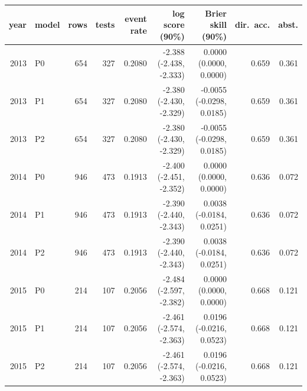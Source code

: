 \begin{tabular}{rlrrrrrrr}
\toprule
year & model & rows & tests & event rate & log score (90\%) & Brier skill (90\%) & dir.\ acc. & abst. \\
\midrule
2013 & P0 & 654 & 327 & 0.2080 & -2.388 (-2.438, -2.333) & 0.0000 (0.0000, 0.0000) & 0.659 & 0.361 \\
2013 & P1 & 654 & 327 & 0.2080 & -2.380 (-2.430, -2.329) & -0.0055 (-0.0298, 0.0185) & 0.659 & 0.361 \\
2013 & P2 & 654 & 327 & 0.2080 & -2.380 (-2.430, -2.329) & -0.0055 (-0.0298, 0.0185) & 0.659 & 0.361 \\
2014 & P0 & 946 & 473 & 0.1913 & -2.400 (-2.451, -2.352) & 0.0000 (0.0000, 0.0000) & 0.636 & 0.072 \\
2014 & P1 & 946 & 473 & 0.1913 & -2.390 (-2.440, -2.343) & 0.0038 (-0.0184, 0.0251) & 0.636 & 0.072 \\
2014 & P2 & 946 & 473 & 0.1913 & -2.390 (-2.440, -2.343) & 0.0038 (-0.0184, 0.0251) & 0.636 & 0.072 \\
2015 & P0 & 214 & 107 & 0.2056 & -2.484 (-2.597, -2.382) & 0.0000 (0.0000, 0.0000) & 0.668 & 0.121 \\
2015 & P1 & 214 & 107 & 0.2056 & -2.461 (-2.574, -2.363) & 0.0196 (-0.0216, 0.0523) & 0.668 & 0.121 \\
2015 & P2 & 214 & 107 & 0.2056 & -2.461 (-2.574, -2.363) & 0.0196 (-0.0216, 0.0523) & 0.668 & 0.121 \\
\bottomrule
\end{tabular}
